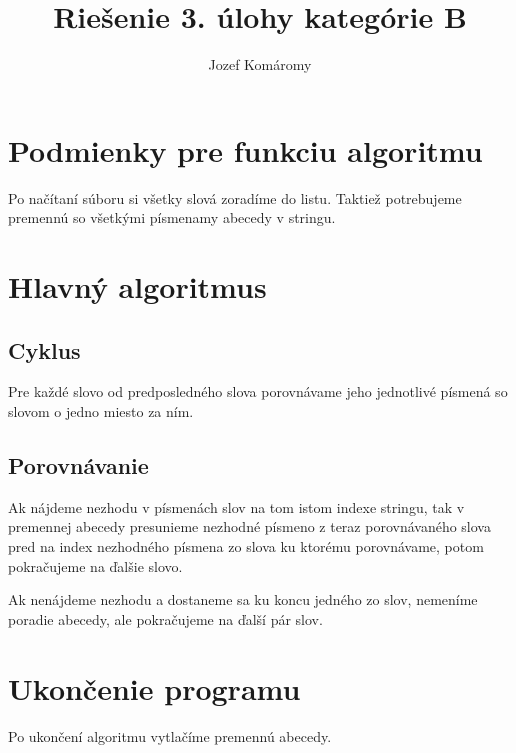 \documentclass{article}
\begin{document}
\title{Riešenie 3. úlohy kategórie B}
\author{Jozef Komáromy}

\maketitle

\section{Podmienky pre funkciu algoritmu}

Po načítaní súboru si všetky slová zoradíme do listu.
Taktiež potrebujeme premennú so všetkými písmenamy abecedy v stringu.

\section{Hlavný algoritmus}
\subsection{Cyklus}
Pre každé slovo od predposledného slova porovnávame jeho jednotlivé písmená so slovom o jedno miesto za ním.
\subsection{Porovnávanie}
Ak nájdeme nezhodu v písmenách slov na tom istom indexe stringu, tak v premennej abecedy presunieme nezhodné písmeno z teraz porovnávaného slova pred na index nezhodného písmena zo slova ku ktorému porovnávame, potom pokračujeme na ďalšie slovo.

Ak nenájdeme nezhodu a dostaneme sa ku koncu jedného zo slov, nemeníme poradie abecedy, ale pokračujeme na ďalší pár slov.

\section{Ukončenie programu}
Po ukončení algoritmu vytlačíme premennú abecedy.
\end{document}
